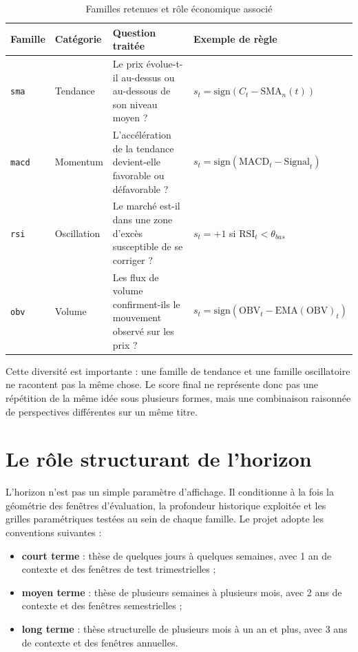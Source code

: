 \begin{table}[H]
\centering
\caption{Familles retenues et rôle économique associé}
\label{tab:signal-families}
\begin{tabular}{p{2.2cm}p{3cm}p{4.8cm}p{4.2cm}}
\toprule
\textbf{Famille} & \textbf{Catégorie} & \textbf{Question traitée} & \textbf{Exemple de règle} \\
\midrule
\texttt{sma} & Tendance & Le prix évolue-t-il au-dessus ou au-dessous de son niveau moyen ? & \(s_t=\mathrm{sign}(C_t-\mathrm{SMA}_n(t))\) \\
\texttt{macd} & Momentum & L'accélération de la tendance devient-elle favorable ou défavorable ? & \(s_t=\mathrm{sign}(\mathrm{MACD}_t-\mathrm{Signal}_t)\) \\
\texttt{rsi} & Oscillation & Le marché est-il dans une zone d'excès susceptible de se corriger ? & \(s_t=+1\) si \(\mathrm{RSI}_t<\theta_{bas}\) \\
\texttt{obv} & Volume & Les flux de volume confirment-ils le mouvement observé sur les prix ? & \(s_t=\mathrm{sign}(\mathrm{OBV}_t-\mathrm{EMA}(\mathrm{OBV})_t)\) \\
\bottomrule
\end{tabular}
\end{table}

Cette diversité est importante : une famille de tendance et une famille
oscillatoire ne racontent pas la même chose. Le score final ne représente donc
pas une répétition de la même idée sous plusieurs formes, mais une combinaison
raisonnée de perspectives différentes sur un même titre.

\section{Le rôle structurant de l'horizon}
L'horizon n'est pas un simple paramètre d'affichage. Il conditionne à la fois la
géométrie des fenêtres d'évaluation, la profondeur historique exploitée et les
grilles paramétriques testées au sein de chaque famille. Le projet adopte les
conventions suivantes :
\begin{itemize}
\item \textbf{court terme} : thèse de quelques jours à quelques semaines, avec
1 an de contexte et des fenêtres de test trimestrielles ;
\item \textbf{moyen terme} : thèse de plusieurs semaines à plusieurs mois, avec
2 ans de contexte et des fenêtres semestrielles ;
\item \textbf{long terme} : thèse structurelle de plusieurs mois à un an et plus,
avec 3 ans de contexte et des fenêtres annuelles.
\end{itemize}


